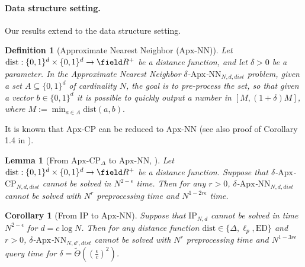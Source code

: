 \documentclass[11pt]{article}
\theoremstyle{plain}
\newtheorem{lem}[thm]{Lemma}
\newtheorem{defn}[thm]{Definition}
\newtheorem{cor}[thm]{Corollary}
\theoremstyle{remark}
\newcommand{\IP}{\mathrm{IP}}
\newcommand{\CP}{\mathrm{CP}}
\newcommand{\NN}{\mathrm{NN}}
\newcommand{\ED}{\mathrm{ED}}
\newcommand{\Apx}{\mathrm{Apx}}
\newcommand{\dist}{\mathrm{dist}}
\begin{document}
\paragraph{Data structure setting.}
Our results extend to the data structure setting.
\begin{defn}[Approximate Nearest Neighbor ($\Apx$-$\NN$)] 
    Let $\dist:\{0,1\}^d \times\{0,1\}^d \to\field R^+$ be a distance function, and let $\delta > 0$ be a parameter. In the \textsf{Approximate Nearest Neighbor $\delta$-$\Apx$-$\NN_{N,d,dist}$ problem}, given a set $A\subseteq\{0,1\}^d$ of cardinality $N$, the goal is to pre-process the set, so that given a vector $b\in\{0,1\}^d$ it is possible to quickly output a number in $[M, (1+\delta)M]$, where $M:=\min_{a \in A} \dist(a,b).$
\end{defn}

It is known that $\Apx$-$\CP$ can be reduced to $\Apx$-$\NN$ \cite{WW18} (see also proof of Corollary 1.4 in \cite{ARW17}).

\begin{lem}[From $\Apx$-$\CP_{\Delta}$ to $\Apx$-$\NN$, \cite{WW18}] \label{lem:CPtoANN}
    Let $\dist:\{0,1\}^d \times\{0,1\}^d \to\field R^+$ be a distance function. Suppose that $\delta$-$\Apx$-$\CP_{N, d, dist}$ cannot be solved in $N^{2-\epsilon}$ time. Then for any $r>0$, $\delta$-$\Apx$-$\NN_{N,d, dist}$ cannot be solved with $N^r$ preprocessing time and $N^{1-2r\epsilon}$ time.
\end{lem}


\begin{cor}[From $\IP$ to $\Apx$-$\NN$]
Suppose that $\IP_{N,d}$ cannot be solved in time $N^{2-\epsilon}$ for $d = c \log N$. Then for any distance function $\dist \in \{\Delta,\ell_p,\ED\}$ and $r>0$, $\delta$-$\Apx$-$\NN_{N,d',dist}$ cannot be solved with $N^r$ preprocessing time and $N^{1-3r\epsilon}$ query time for $\delta = \tilde \Theta (( \frac \epsilon c)^2)$.
\end{cor}
\end{document}
